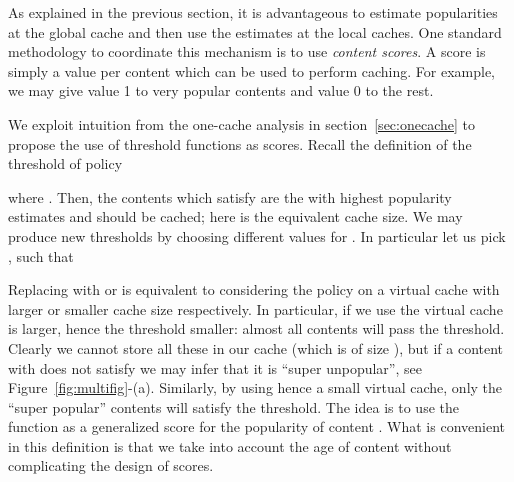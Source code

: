 \documentclass[10pt, conference, letterpaper]{IEEEtran}
\begin{document}
As explained in the previous section, it is advantageous to estimate popularities at the global cache and then use the estimates at the local caches. One standard methodology to coordinate this mechanism is to use \emph{content scores}. A score is simply a value per content which can be used to perform caching. For example, we may give value 1 to very popular contents and value 0 to the rest. 

We exploit intuition from the one-cache analysis in section~\ref{sec:onecache} to propose the use of threshold functions  as scores. 
Recall the definition of the threshold 
of  policy

where .
Then, the contents which satisfy  are the  with highest popularity estimates and should be cached; 
here  is the equivalent cache size.
We may produce new thresholds by choosing different values for . In particular let us pick ,  such that

Replacing  with  or  is equivalent to considering the  policy on a virtual cache with larger or smaller cache size respectively. In particular, if we use  the virtual cache is larger, hence the threshold  smaller: almost all contents will pass the threshold. Clearly we cannot store all these in our cache (which is of size ), but if a content with  does not satisfy  we may infer that it is ``super unpopular'', see Figure~\ref{fig:multifig}-(a). Similarly, by using  hence a small virtual cache, only the ``super popular'' contents will satisfy the threshold.
The idea is to use  the function  as a generalized score for the popularity of content . 
What is convenient in this definition is that we take into account the age of content without complicating the design of scores.
\end{document}
